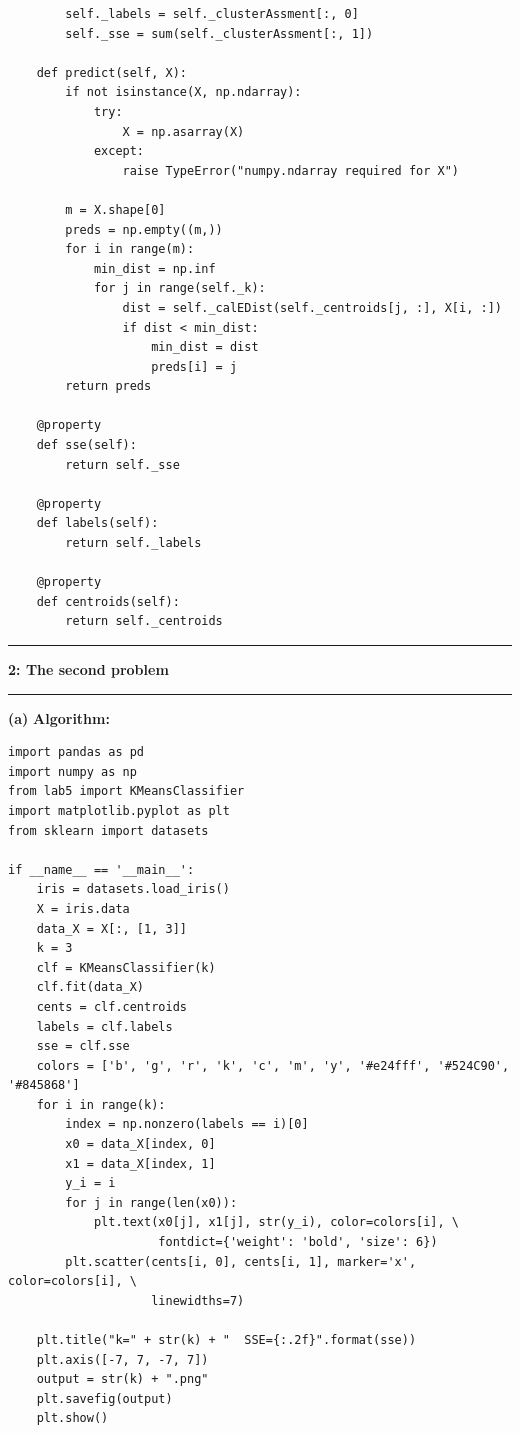 \documentclass[11pt]{article}
\newcommand\question[2]{\vspace{.25in}\hrule\textbf{#1: #2}\vspace{.5em}\hrule\vspace{.10in}}
\renewcommand\part[1]{\vspace{.10in}\textbf{(#1)}}
\newcommand\algorithm{\vspace{.10in}\textbf{Algorithm: }}
\begin{document}
\begin{lstlisting}
        self._labels = self._clusterAssment[:, 0]
        self._sse = sum(self._clusterAssment[:, 1])

    def predict(self, X):
        if not isinstance(X, np.ndarray):
            try:
                X = np.asarray(X)
            except:
                raise TypeError("numpy.ndarray required for X")

        m = X.shape[0]
        preds = np.empty((m,))
        for i in range(m):
            min_dist = np.inf
            for j in range(self._k):
                dist = self._calEDist(self._centroids[j, :], X[i, :])
                if dist < min_dist:
                    min_dist = dist
                    preds[i] = j
        return preds

    @property
    def sse(self):
        return self._sse

    @property
    def labels(self):
        return self._labels

    @property
    def centroids(self):
        return self._centroids

\end{lstlisting}

\question{2}{The second problem}

\part{a} \algorithm
\begin{lstlisting}
import pandas as pd
import numpy as np
from lab5 import KMeansClassifier
import matplotlib.pyplot as plt
from sklearn import datasets

if __name__ == '__main__':
    iris = datasets.load_iris()
    X = iris.data
    data_X = X[:, [1, 3]]
    k = 3
    clf = KMeansClassifier(k)
    clf.fit(data_X)
    cents = clf.centroids
    labels = clf.labels
    sse = clf.sse
    colors = ['b', 'g', 'r', 'k', 'c', 'm', 'y', '#e24fff', '#524C90', '#845868']
    for i in range(k):
        index = np.nonzero(labels == i)[0]
        x0 = data_X[index, 0]
        x1 = data_X[index, 1]
        y_i = i
        for j in range(len(x0)):
            plt.text(x0[j], x1[j], str(y_i), color=colors[i], \
                     fontdict={'weight': 'bold', 'size': 6})
        plt.scatter(cents[i, 0], cents[i, 1], marker='x', color=colors[i], \
                    linewidths=7)

    plt.title("k=" + str(k) + "  SSE={:.2f}".format(sse))
    plt.axis([-7, 7, -7, 7])
    output = str(k) + ".png"
    plt.savefig(output)
    plt.show()
    
\end{lstlisting}
\end{document}
